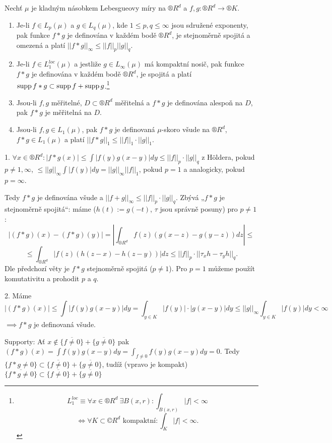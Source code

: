 \documentclass[12pt]{article}					%
\begin{document}
\begin{veta}
	Nechť $\mu$ je kladným násobkem Lebesgueovy míry na $®R^d$ a $f, g: ®R^d \rightarrow ®K$.\vspace{-2em}

	\begin{enumerate}
		\item Je-li $f \in L_p(\mu)$ a $g \in L_q(\mu)$, kde $1 ≤ p, q ≤ ∞$ jsou sdružené exponenty, pak funkce $f*g$ je definována v každém bodě $®R^d$, je stejnoměrně spojitá a omezená a platí $||f * g||_∞ ≤ ||f||_p ||g||_q$.
		\item Je-li $f \in L_1^{loc}(\mu)$ a jestliže $g \in L_∞(\mu)$ má kompaktní nosič, pak funkce $f * g$ je definována v každém bodě $®R^d$, je spojitá a platí $\operatorname{supp} f*g \subset \operatorname{supp} f + \operatorname{supp} g$.\footnote{$$ L_1^{loc} ≡ \forall x \in ®R^d\ \exists B(x, r): \int_{B(x, r)} |f| < ∞ $$ $$ \Leftrightarrow \forall K \subset ©R^d \text{ kompaktní}: \int_K |f| < ∞. $$}
		\item Jsou-li $f, g$ měřitelné, $D \subset ®R^d$ měřitelná a $f*g$ je definována alespoň na $D$, pak $f*g$ je měřitelná na $D$.
		\item Jsou-li $f, g \in L_1(\mu)$, pak $f*g$ je definovaná $\mu$-skoro všude na $®R^d$, $f*g \in L_1(\mu)$ a platí $||f * g||_1 ≤ ||f||_1·||g||_1$.
	\end{enumerate}

	\begin{dukazin}
		1. $\forall x \in ®R^d: |f*g(x)| ≤ \int |f(y)g(x - y)| dy ≤ ||f||_p·||g||_q$ z Höldera, pokud $p ≠ 1, ∞$, $≤ ||g||_∞ \int|f(y)| dy = ||g||_∞ ||f||_1$, pokud $p = 1$ a analogicky, pokud $p = ∞$.

		Tedy $f * g$ je definována všude a $||f + g||_∞ ≤ ||f||_p·||g||_q$. Zbývá „$f*g$ je stejnoměrně spojitá“: máme ($h(t) := g(-t)$, $\tau$ jsou správně posuny) pro $p ≠ 1$:
		$$ |(f * g)(x) - (f * g)(y)| = \left|\int_{®R^d} f(z)(g(x - z) - g(y - z))dz \right| ≤ $$
		$$ ≤ \int_{®R^d} |f(z)(h(z - x) - h(z - y))| dz ≤ ||f||_p · ||\tau_x h - \tau_y h||_q. $$
		Dle předchozí věty je $f * g$ stejnoměrně spojitá ($p ≠ 1$). Pro $p = 1$ můžeme použít komutativitu a prohodit $p$ a $q$.

		2. Máme
		$$ |(f * g)(x)| ≤ \int |f(y)g(x - y)|dy = \int_{y \in K} |f(y)|·|g(x - y)| dy ≤ ||g||_∞ \int_{y \in K} |f(y)| dy < ∞ $$
		$\implies f*g$ je definovaná všude.

		Supporty: Ať $x \notin \overline{\{f ≠ 0\}} + \overline{\{g ≠ 0\}}$ pak $(f * g)(x) = \int f(y) g(x - y) dy = \int_{f ≠ 0} f(y) g(x - y) dy = 0$. Tedy $\{f * g ≠ 0\} \subset \overline{\{f ≠ 0\}} + \overline{\{g ≠ 0\}}$, tudíž (vpravo je kompakt) $\overline{\{f * g ≠ 0\}} \subset \overline{\{f ≠ 0\}} + \overline{\{g ≠ 0\}}$


\end{dukazin}
\end{veta}
\end{document}

